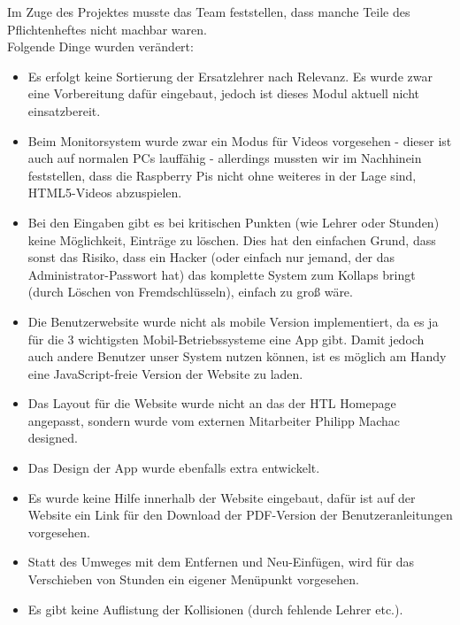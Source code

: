 Im Zuge des Projektes musste das Team feststellen, dass manche Teile des Pflichtenheftes nicht machbar waren.\\
Folgende Dinge wurden verändert:
\begin{itemize}
	\item Es erfolgt keine Sortierung der Ersatzlehrer nach Relevanz. Es wurde zwar eine Vorbereitung dafür eingebaut, jedoch ist dieses Modul aktuell nicht einsatzbereit.
	\item Beim Monitorsystem wurde zwar ein Modus für Videos vorgesehen - dieser ist auch auf normalen PCs lauffähig - allerdings mussten wir im Nachhinein feststellen, dass die Raspberry Pis nicht ohne weiteres in der Lage sind, HTML5-Videos abzuspielen.
	\item Bei den Eingaben gibt es bei kritischen Punkten (wie Lehrer oder Stunden) keine Möglichkeit, Einträge zu löschen. Dies hat den einfachen Grund, dass sonst das Risiko, dass ein Hacker (oder einfach nur jemand, der das Administrator-Passwort hat) das komplette System zum Kollaps bringt (durch Löschen von Fremdschlüsseln), einfach zu groß wäre.
	\item Die Benutzerwebsite wurde nicht als mobile Version implementiert, da es ja für die 3 wichtigsten Mobil-Betriebssysteme eine App gibt. Damit jedoch auch andere Benutzer unser System nutzen können, ist es möglich am Handy eine JavaScript-freie Version der Website zu laden.
	\item Das Layout für die Website wurde nicht an das der HTL Homepage angepasst, sondern wurde vom externen Mitarbeiter Philipp Machac designed.
	\item Das Design der App wurde ebenfalls extra entwickelt.
	\item Es wurde keine Hilfe innerhalb der Website eingebaut, dafür ist auf der Website ein Link für den Download der PDF-Version der Benutzeranleitungen vorgesehen.
	\item Statt des Umweges mit dem Entfernen und Neu-Einfügen, wird für das Verschieben von Stunden ein eigener Menüpunkt vorgesehen.
	\item Es gibt keine Auflistung der Kollisionen (durch fehlende Lehrer etc.).
\end{itemize}